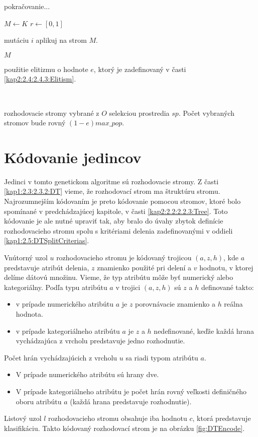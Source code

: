 \begin{algorithm}
\ContinuedFloat
\caption{pokračovanie...}
\begin{algorithmic}[1]
\State $M \gets K$
\State $r \gets [0,1]$
	\State \parbox[t]{300pt}{mutáciu $i$ aplikuj na strom $M$.}
\EndIf
\State \Return $M$
\EndFor 
\EndFunction
\\
\State \Return \parbox[t]{300pt}{použitie elitizmu o hodnote $e$, ktorý je zadefinovaný v časti \ref{kap2:2.4:2.4.3:Elitism}.}
\EndFunction
\\
\State \Return \parbox[t]{300pt}{rozhodovacie stromy vybrané z $O$ selekciou prostredia $sp$. Počet vybraných stromov bude rovný $(1-e)max\_pop$.}
\EndFunction
\end{algorithmic}
\end{algorithm}

\section{Kódovanie jedincov}\label{kap3:3.2:Encoding}
Jedinci v tomto genetickom algoritme sú rozhodovacie stromy. Z časti \ref{kap1:2.3:2.3.2:DT} vieme, že rozhodovací strom ma štruktúru stromu. Najrozumnejším kódovaním je preto kódovanie pomocou stromov, ktoré bolo spomínané v predchádzajúcej kapitole, v časti \ref{kap2:2.2:2.2.3:Tree}. Toto kódovanie je ale nutné upraviť tak, aby bralo do úvahy zbytok definície rozhodovacieho stromu spolu s kritériami delenia zadefinovanými v oddieli \ref{kap1:2.5:DTSplitCriterias}.

Vnútorný uzol $u$ rozhodovacieho stromu je kódovaný trojicou $(a,z,h)$, kde $a$ predstavuje atribút delenia, $z$ znamienko použité pri delení a $v$ hodnotu, v ktorej delíme dátovú množinu. Vieme, že typ atribútu môže byť numerický alebo kategoriálny. Podľa typu atribútu $a$ v trojici $(a,z,h)$ sú $z$ a $h$ definované takto:
\begin{itemize}
\item v prípade numerického atribútu $a$ je $z$  porovnávacie znamienko a $h$ reálna hodnota.
\item v prípade kategoriálneho atribútu $a$ je $z$ a $h$ nedefinované, keďže každá hrana vychádzajúca z vrcholu predstavuje jedno rozhodnutie.
\end{itemize}
Počet hrán vychádzajúcich z vrcholu $u$ sa riadi typom atribútu $a$.
\begin{itemize}
\item V prípade numerického atribútu sú hrany dve.
\item V prípade kategoriálneho atribútu je počet hrán rovný veľkosti definičného oboru atribútu $a$ (každá hrana predstavuje rozhodnutie).
\end{itemize}
Listový uzol $l$ rozhodovacieho stromu obsahuje iba hodnotu $c$, ktorá predstavuje klasifikáciu.
Takto kódovaný rozhodovací strom je na obrázku \ref{fig:DTEncode}.
